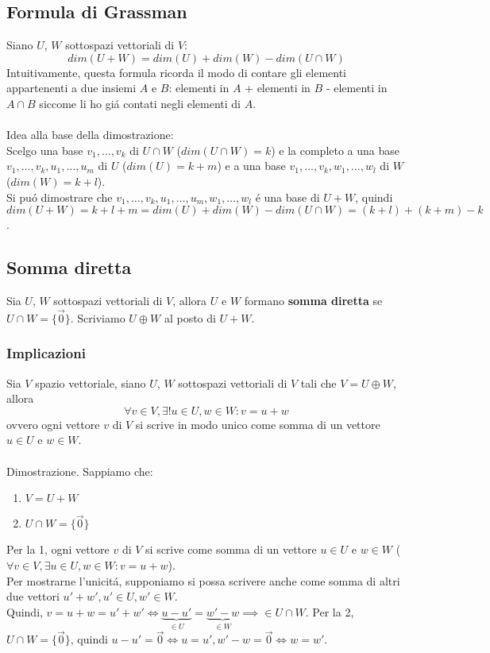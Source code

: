 \documentclass{article}
\begin{document}
\subsection{Formula di Grassman}
Siano $U$, $W$ sottospazi vettoriali di $V$:
$$dim(U + W) = dim(U) + dim(W) - dim(U \cap W)$$
Intuitivamente, questa formula ricorda il modo di contare gli elementi appartenenti a due insiemi $A$ e $B$: elementi in $A$ + elementi in $B$ - elementi in $A \cap B$ siccome li ho giá contati negli elementi di $A$.\\\\
Idea alla base della dimostrazione:\\
Scelgo una base $v_1, \dots, v_k$ di $U \cap W$ ($dim(U \cap W) = k$) e la completo a una base $v_1, \dots, v_k ,u_1, \dots, u_m$ di $U$ ($dim(U) = k + m$) e a una base $v_1, \dots, v_k ,w_1, \dots, w_l$ di $W$ ($dim(W) = k + l$).\\
Si puó dimostrare che $v_1, \dots, v_k, u_1, \dots, u_m, w_1, \dots, w_l$ é una base di $U + W$, quindi $dim(U + W) = k + l + m = dim(U) + dim(W) - dim(U \cap W) = (k + l) + (k + m) - k$.

\subsection{Somma diretta}
Sia $U$, $W$ sottospazi vettoriali di $V$, allora $U$ e $W$ formano \textbf{somma diretta} se $U \cap W = \{\vec{0}\}$. Scriviamo $U \oplus W$ al posto di $U + W$.

\subsubsection{Implicazioni}
Sia $V$ spazio vettoriale, siano $U$, $W$ sottospazi vettoriali di $V$ tali che $V = U \oplus W$, allora $$\forall v \in V, \exists! u \in U, w \in W : v = u + w$$
ovvero ogni vettore $v$ di $V$ si scrive in modo unico come somma di un vettore $u \in U$ e $w \in W$.\\\\
Dimostrazione. Sappiamo che:
\begin{enumerate}
	\item $V = U + W$
	\item $U \cap W = \{\vec{0}\}$
\end{enumerate}
Per la 1, ogni vettore $v$ di $V$ si scrive come somma di un vettore $u \in U$ e $w \in W$ ($\forall v \in V, \exists u \in U, w \in W : v = u + w$).\\
Per mostrarne l'unicitá, supponiamo si possa scrivere anche come somma di altri due vettori $u\prime + w\prime, u\prime \in U, w\prime \in W$.\\
Quindi, $v = u + w = u\prime + w\prime \iff \underbrace{u - u\prime}_{\in U} = \underbrace{w\prime - w}_{\in W} \implies \in U \cap W$. Per la 2, $U \cap W = \{\vec{0}\}$, quindi $u - u\prime = \vec{0} \iff u = u\prime, w\prime - w = \vec{0} \iff w = w\prime$.
\end{document}

